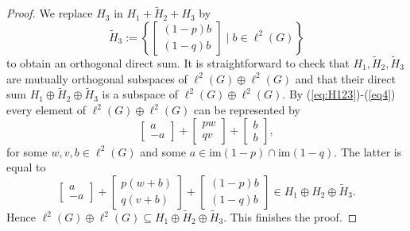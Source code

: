 \documentclass[a4paper,leqno,12pt]{article}
\numberwithin{equation}{section}
\theoremstyle{plain}
\theoremstyle{definition}
\theoremstyle{remark}
\newtheorem{remark}[theoremcounter]{Remark}
\newcommand{\Csr}{\mathrm{C}^*_{\text{red}}}
\begin{document}
\begin{proof}
		We replace $H_3$ in $H_1+ \tilde H_2+H_3$ by 
		\[
		\tilde H_3:=\left\{\begin{bmatrix}(1-p)b \\ (1-q)b \end{bmatrix} \mid  b\in \ell^2(G) \right\}
		\]
		to obtain an orthogonal direct sum. It is straightforward to check that $H_1, \tilde H_2, \tilde H_3$ are mutually orthogonal subspaces of $\ell^2(G)\oplus \ell^2(G)$ and that their direct sum $H_1\oplus \tilde H_2\oplus\tilde H_3$ is a subspace of $\ell^2(G)\oplus \ell^2(G)$.
		By (\ref{eq:H123})-(\ref{eq4}) every element of $\ell^2(G)\oplus \ell^2(G)$ can be represented by 
		\[
		\begin{bmatrix}a\\ -a\end{bmatrix}+\begin{bmatrix}pw\\ qv\end{bmatrix}+\begin{bmatrix}b\\ b\end{bmatrix},
		\]
		for some $w,v,b\in \ell^2(G)$ and some $a\in\mathrm{im}(1-p)\cap\mathrm{im}(1-q)$. The latter is equal to 
		\[
		\begin{bmatrix}a\\ -a\end{bmatrix}+\begin{bmatrix}p(w+b)\\ q(v+b)\end{bmatrix}+\begin{bmatrix}(1-p)b\\ (1-q)b\end{bmatrix}\in H_1\oplus H_2\oplus \tilde H_3.
		\]
		Hence $\ell^2(G)\oplus \ell^2(G)\subseteq H_1\oplus \tilde H_2\oplus \tilde H_3$.
		This finishes the proof.
	\end{proof}
		
\end{document}
